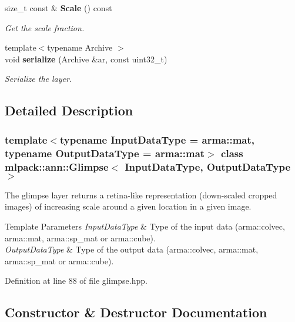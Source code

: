 \begin{DoxyCompactItemize}
size\+\_\+t const  \& \textbf{ Scale} () const
\begin{DoxyCompactList}\small\item\em Get the scale fraction. \end{DoxyCompactList}\item 
{\footnotesize template$<$typename Archive $>$ }\\void \textbf{ serialize} (Archive \&ar, const uint32\+\_\+t)
\begin{DoxyCompactList}\small\item\em Serialize the layer. \end{DoxyCompactList}\end{DoxyCompactItemize}


\subsection{Detailed Description}
\subsubsection*{template$<$typename Input\+Data\+Type = arma\+::mat, typename Output\+Data\+Type = arma\+::mat$>$\newline
class mlpack\+::ann\+::\+Glimpse$<$ Input\+Data\+Type, Output\+Data\+Type $>$}

The glimpse layer returns a retina-\/like representation (down-\/scaled cropped images) of increasing scale around a given location in a given image. 


\begin{DoxyTemplParams}{Template Parameters}
{\em Input\+Data\+Type} & Type of the input data (arma\+::colvec, arma\+::mat, arma\+::sp\+\_\+mat or arma\+::cube). \\
\hline
{\em Output\+Data\+Type} & Type of the output data (arma\+::colvec, arma\+::mat, arma\+::sp\+\_\+mat or arma\+::cube). \\
\hline
\end{DoxyTemplParams}


Definition at line 88 of file glimpse.\+hpp.



\subsection{Constructor \& Destructor Documentation}
\mbox{\label{classmlpack_1_1ann_1_1Glimpse_a19c2ef07809ce53bd8eef72ed2c6e1eb}} 
